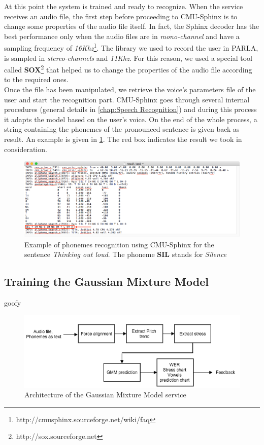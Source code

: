 \noindent At this point the system is trained and ready to recognize. When the service receives an audio file, the first step before proceeding to CMU-Sphinx is to change some properties of the audio file itself. In fact, the Sphinx decoder has the best performance only when the audio files are in \textit{mono-channel} and have a sampling frequency of \textit{16Khz}\footnote{http://cmusphinx.sourceforge.net/wiki/faq}. The library we used to record the user in PARLA, is sampled in \textit{stereo-channels} and \textit{11Khz}. For this reason, we used a special tool called \textbf{SOX}\footnote{http://sox.sourceforge.net} that helped us to change the properties of the audio file according to the required ones. \\

\noindent Once the file has been manipulated, we retrieve the voice's parameters file of the user and start the recognition part. CMU-Sphinx goes through several internal procedures (general details in \ref{chap:Speech Recognition}) and during this process it adapts the model based on the user's voice. On the end of the whole process, a string containing the phonemes of the pronounced sentence is given back as result. An example is given in \ref{fig:result_sphinx}. The red box indicates the result we took in consideration.

\begin{figure}[!ht]
	\centering
	\includegraphics[scale=0.5]{Figures/result_sphinx.png}
	\caption{Example of phonemes recognition using CMU-Sphinx for the sentence \textit{Thinking out loud}. The phoneme \textbf{SIL} stands for \textit{Silence}}
	\label{fig:result_sphinx}
\end{figure}

\subsection{Training the Gaussian Mixture Model}
\label{ssec:training_gmm}

goofy

\begin{figure}[!ht]
	\centering
	\includegraphics[scale=0.6]{Figures/gmm_service.png}
	\caption{Architecture of the Gaussian Mixture Model service}
	\label{fig:gmm_service}
\end{figure}


